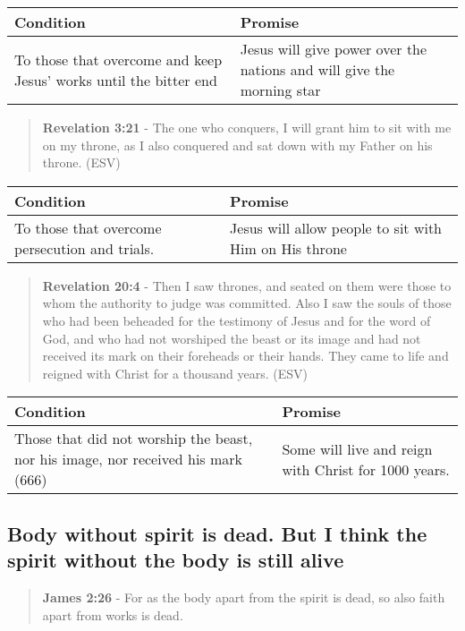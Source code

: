 \documentclass[11pt]{article}
\begin{document}
\begin{center}
\begin{tabular}{ll}
Condition & Promise\\[0pt]
\hline
To those that overcome and keep Jesus' works until the bitter end & Jesus will give power over the nations and will give the morning star\\[0pt]
\end{tabular}
\end{center}

\begin{quote}
\textbf{Revelation 3:21} - The one who conquers, I will grant him to sit with me on my throne, as I also conquered and sat down with my Father on his throne. (ESV)
\end{quote}

\begin{center}
\begin{tabular}{ll}
Condition & Promise\\[0pt]
\hline
To those that overcome persecution and trials. & Jesus will allow people to sit with Him on His throne\\[0pt]
\end{tabular}
\end{center}

\begin{quote}
\textbf{Revelation 20:4} - Then I saw thrones, and seated on them were those to whom the authority to judge was committed. Also I saw the souls of those who had been beheaded for the testimony of Jesus and for the word of God, and who had not worshiped the beast or its image and had not received its mark on their foreheads or their hands. They came to life and reigned with Christ for a thousand years. (ESV)
\end{quote}

\begin{center}
\begin{tabular}{ll}
Condition & Promise\\[0pt]
\hline
Those that did not worship the beast, nor his image, nor received his mark (666) & Some will live and reign with Christ for 1000 years.\\[0pt]
\end{tabular}
\end{center}

\subsection{Body without spirit is dead. But I think the spirit without the body is still alive}
\label{sec:org7f26951}
\begin{quote}
\textbf{James 2:26} - For as the body apart from the spirit is dead, so also faith apart from works is dead.
\end{quote}
\end{document}
